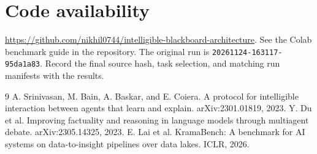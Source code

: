\documentclass[11pt,a4paper,twocolumn]{article}
\begin{document}
\section*{Code availability}
\url{https://github.com/nikhil0744/intelligible-blackboard-architecture}.
See the Colab benchmark guide in the repository. The original run is \texttt{20261124-163117-95da1a83}. Record the final source hash, task selection, and matching run manifests with the results.

\begin{thebibliography}{9}
\small
{} A. Srinivasan, M. Bain, A. Baskar, and E. Coiera.
A protocol for intelligible interaction between agents that learn and explain.
arXiv:2301.01819, 2023.
 Y. Du et al.
Improving factuality and reasoning in language models through multiagent debate.
arXiv:2305.14325, 2023.
 E. Lai et al.
KramaBench: A benchmark for AI systems on data-to-insight pipelines over data lakes.
ICLR, 2026.
\end{thebibliography}
\end{document}
